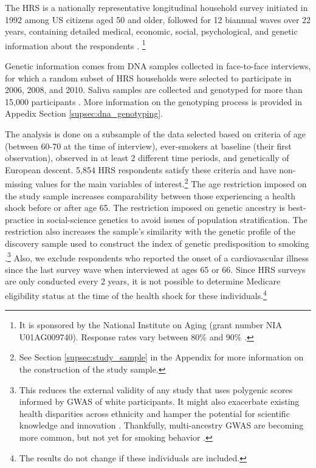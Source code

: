 \documentclass[11pt]{article}
\begin{document}
The HRS is a nationally representative longitudinal household survey initiated in 1992 among US citizens aged 50 and older, followed for 12 biannual waves over 22 years, containing detailed medical, economic, social, psychological, and genetic information about the respondents \citep{Sonnega2014cohort}.%
\footnote{
It is sponsored by the National Institute on Aging (grant number NIA U01AG009740).%
Response rates vary between 80\% and 90\% \citep{HRSResponseRate}. 
}

Genetic information comes from DNA samples collected in face-to-face interviews, for which a random subset of HRS households were selected to participate in 2006, 2008, and 2010.
Saliva samples are collected and genotyped for more than 15,000 participants \citep{HRSPGenscore2017}.
More information on the genotyping process is provided in Appedix Section \ref{supsec:dna_genotyping}.

The analysis is done on a subsample of the data selected based on criteria of age (between 60-70 at the time of interview), ever-smokers at baseline (their first observation), observed in at least 2 different time periods, and genetically of European descent.
5,854 HRS respondents satisfy these criteria and have non-missing values for the main variables of interest.\footnote{See Section \ref{supsec:study_sample} in the Appendix for more information on the construction of the study sample.}
The age restriction imposed on the study sample increases comparability between those experiencing a health shock before or after age 65.
The restriction imposed on genetic ancestry is best-practice in social-science genetics to avoid issues of population stratification\citep{Hamer2000}. The restriction also increases the sample's similarity with the genetic profile of the discovery sample used to construct the index of genetic predisposition to smoking \citep{Martin2017,Freese2018}.\footnote{This reduces the external validity of any study that uses polygenic scores informed by GWAS of white participants. It might also exacerbate existing health disparities across ethnicity and hamper the potential for scientific knowledge and innovation \citep{Martin2019}. Thankfully, multi-ancestry GWAS are becoming more common, but not yet for smoking behavior \citep{Peterson2019}.}
Also, we exclude respondents who reported the onset of a cardiovascular illness since the last survey wave when interviewed at ages 65 or 66. Since HRS surveys are only conducted every 2 years, it is not possible to determine Medicare eligibility status at the time of the health shock for these individuals.\footnote{The results do not change if these individuals are included.}
\end{document}
